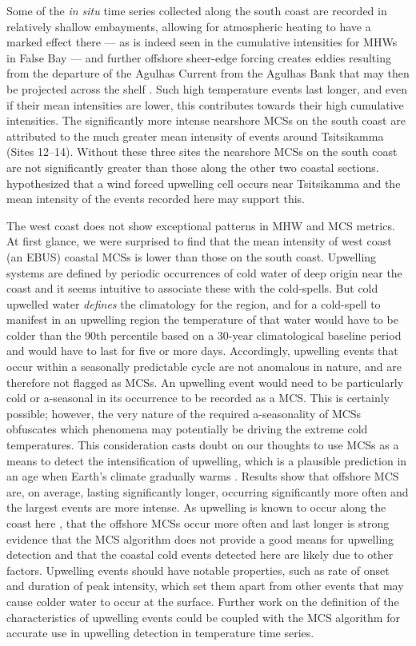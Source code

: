 \documentclass[a4paper,10pt,review]{elsarticle}
\begin{document}
Some of the \emph{in situ} time series collected along the south coast are recorded in relatively shallow embayments, allowing for atmospheric heating to have a marked effect there --- as is indeed seen in the cumulative intensities for MHWs in False Bay --- and further offshore sheer-edge forcing creates eddies resulting from the departure of the Agulhas Current from the Agulhas Bank that may then be projected across the shelf \citep{Lutjeharms2003}. Such high temperature events last longer, and even if their mean intensities are lower, this contributes towards their high cumulative intensities. The significantly more intense nearshore MCSs on the south coast are attributed to the much greater mean intensity of events around Tsitsikamma (Sites 12--14). Without these three sites the nearshore MCSs on the south coast are not significantly greater than those along the other two coastal sections. \citep{Roberts2005} hypothesized that a wind forced upwelling cell occurs near Tsitsikamma and the mean intensity of the events recorded here may support this.

The west coast does not show exceptional patterns in MHW and MCS metrics. At first glance, we were surprised to find that the mean intensity of west coast (an EBUS) coastal MCSs is lower than those on the south coast. Upwelling systems are defined by periodic occurrences of cold water of deep origin near the coast \citep{Lutjeharms2000, Hutchings2009} and it seems intuitive to associate these with the cold-spells. But cold upwelled water \emph{defines} the climatology for the region, and for a cold-spell to manifest in an upwelling region the temperature of that water would have to be colder than the 90th percentile based on a 30-year climatological baseline period and would have to last for five or more days. Accordingly, upwelling events that occur within a seasonally predictable cycle are not anomalous in nature, and are therefore not flagged as MCSs. An upwelling event would need to be particularly cold or a-seasonal in its occurrence to be recorded as a MCS. This is certainly possible; however, the very nature of the required a-seasonality of MCSs obfuscates which phenomena may potentially be driving the extreme cold temperatures. This consideration casts doubt on our thoughts to use MCSs as a means to detect the intensification of upwelling, which is a plausible prediction in an age when Earth's climate gradually warms \citep{Garcia-Reyes2015}. Results show that offshore MCS are, on average, lasting significantly longer, occurring significantly more often and the largest events are more intense. As upwelling is known to occur along the coast here \citep{Hutchings2009}, that the offshore MCSs occur more often and last longer is strong evidence that the MCS algorithm does not provide a good means for upwelling detection and that the coastal cold events detected here are likely due to other factors. Upwelling events should have notable properties, such as rate of onset and duration of peak intensity, which set them apart from other events that may cause colder water to occur at the surface. Further work on the definition of the characteristics of upwelling events could be coupled with the MCS algorithm for accurate use in upwelling detection in temperature time series.
\end{document}
